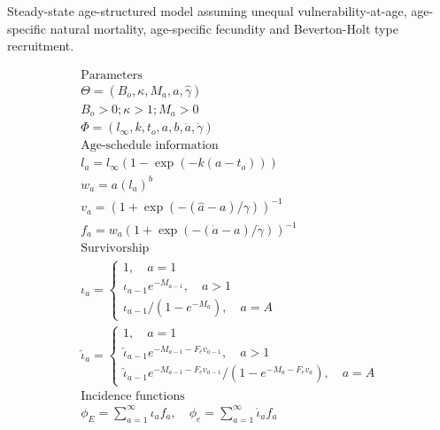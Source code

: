\begin{multicols}{2}
\begin{tablehere}
\caption{Steady-state age-structured model assuming unequal
vulnerability-at-age, age-specific natural mortality, age-specific
fecundity and Beverton-Holt type recruitment.}\label{Table2} 
\tableEq
    \begin{gather}
           \hline
        \mbox{Parameters} \nonumber \\
            \Theta = (B_o,\kappa,M_a,\hat{a},\hat{\gamma}) \label{T2.1}\\
            B_o>0; \kappa > 1; M_a > 0\\
            \Phi = (l_\infty, k, t_o,a,b,\dot{a},\dot{\gamma}) \label{T2.3}\\[1ex]
        \mbox{Age-schedule information} \nonumber\\
            l_a=l_\infty(1-\exp(-k(a-t_o)))\label{T2.4}\\
            w_a=a(l_a)^b \label{T2.5}\\
            v_a=(1+\exp(-(\hat{a}-a)/\gamma))^{-1} \label{T2.6}\\
            f_a=w_a(1+\exp(-(\dot{a}-a)/\dot{\gamma}))^{-1} \label{T2.7}\\[1ex]
        \mbox{Survivorship} \nonumber\\
            \iota_a=\begin{cases} 1, \quad a=1      \label{T2.8} \\
            \iota_{a-1}e^{-M_{a-1}},\quad a>1\\
            \iota_{a-1}/(1-e^{-M_a}),\quad a=A \end{cases}\\
            \hat{\iota}_a=\begin{cases} 1, \quad a=1\\
            \hat{\iota}_{a-1}e^{-M_{a-1}-F_e v_{a-1}},\quad a>1\\
            \hat{\iota}_{a-1}e^{-M_{a-1}-F_e v_{a-1}}/(1-e^{-M_{a}-F_e v_{a}}),\quad a=A
            \end{cases} \label{T2.9}\\[1ex]
        \mbox{Incidence functions} \nonumber \\
            \phi_E=\sum_{a=1}^\infty \iota_a f_a, \quad
            \phi_e=\sum_{a=1}^\infty \hat{\iota}_a f_a \label{T2.10}\\

\end{gather}
\end{tablehere}
\end{multicols}
